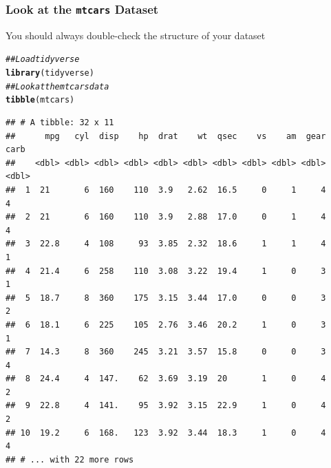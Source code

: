 \documentclass{beamer}\usepackage[]{graphicx}\usepackage[]{color}
\makeatletter
\newcommand{\hlcom}[1]{\textcolor[rgb]{0.678,0.584,0.686}{\textit{#1}}}%
\newcommand{\hlstd}[1]{\textcolor[rgb]{0.345,0.345,0.345}{#1}}%
\newcommand{\hlkwd}[1]{\textcolor[rgb]{0.737,0.353,0.396}{\textbf{#1}}}%
\newenvironment{kframe}{%
 \def\at@end@of@kframe{}%
 \ifinner\ifhmode%
  \def\at@end@of@kframe{\end{minipage}}%
  \begin{minipage}{\columnwidth}%
 \fi\fi%
 \def\FrameCommand##1{\hskip\@totalleftmargin \hskip-\fboxsep
 \colorbox{shadecolor}{##1}\hskip-\fboxsep
     \hskip-\linewidth \hskip-\@totalleftmargin \hskip\columnwidth}%
 \MakeFramed {\advance\hsize-\width
   \@totalleftmargin\z@ \linewidth\hsize
   \@setminipage}}%
 {\par\unskip\endMakeFramed%
 \at@end@of@kframe}
\newenvironment{knitrout}{}{} %
\makeatother
\begin{document}
\begin{frame}[fragile]\frametitle{Look at the \texttt{mtcars} Dataset}
    You should always double-check the structure of your dataset
\begin{knitrout}\footnotesize
{}\color{fgcolor}\begin{kframe}
\begin{alltt}
\hlcom{## Load tidyverse}
\hlkwd{library}\hlstd{(tidyverse)}
\hlcom{## Look at the mtcars data}
\hlkwd{tibble}\hlstd{(mtcars)}
\end{alltt}
\begin{verbatim}
## # A tibble: 32 x 11
##      mpg   cyl  disp    hp  drat    wt  qsec    vs    am  gear  carb
##    <dbl> <dbl> <dbl> <dbl> <dbl> <dbl> <dbl> <dbl> <dbl> <dbl> <dbl>
##  1  21       6  160    110  3.9   2.62  16.5     0     1     4     4
##  2  21       6  160    110  3.9   2.88  17.0     0     1     4     4
##  3  22.8     4  108     93  3.85  2.32  18.6     1     1     4     1
##  4  21.4     6  258    110  3.08  3.22  19.4     1     0     3     1
##  5  18.7     8  360    175  3.15  3.44  17.0     0     0     3     2
##  6  18.1     6  225    105  2.76  3.46  20.2     1     0     3     1
##  7  14.3     8  360    245  3.21  3.57  15.8     0     0     3     4
##  8  24.4     4  147.    62  3.69  3.19  20       1     0     4     2
##  9  22.8     4  141.    95  3.92  3.15  22.9     1     0     4     2
## 10  19.2     6  168.   123  3.92  3.44  18.3     1     0     4     4
## # ... with 22 more rows
\end{verbatim}
\end{kframe}
\end{knitrout}
\end{frame}
\end{document}
